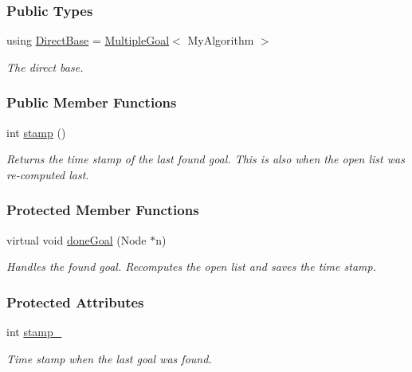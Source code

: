 \subsubsection*{Public Types}
\begin{DoxyCompactItemize}
\item 
using \hyperlink{structgoalHandler_1_1MaxHeuristic_a18437d08c3369dcc371a0cda5d3a3ad5}{Direct\+Base} = \hyperlink{structgoalHandler_1_1MultipleGoal}{Multiple\+Goal}$<$ My\+Algorithm $>$\hypertarget{structgoalHandler_1_1MaxHeuristic_a18437d08c3369dcc371a0cda5d3a3ad5}{}\label{structgoalHandler_1_1MaxHeuristic_a18437d08c3369dcc371a0cda5d3a3ad5}

\begin{DoxyCompactList}\small\item\em The direct base. \end{DoxyCompactList}\end{DoxyCompactItemize}
\subsubsection*{Public Member Functions}
\begin{DoxyCompactItemize}
\item 
int \hyperlink{structgoalHandler_1_1MaxHeuristic_a0c4d879c2cac99ca28665937b2e71324}{stamp} ()
\begin{DoxyCompactList}\small\item\em Returns the time stamp of the last found goal. This is also when the open list was re-\/computed last. \end{DoxyCompactList}\end{DoxyCompactItemize}
\subsubsection*{Protected Member Functions}
\begin{DoxyCompactItemize}
\item 
virtual void \hyperlink{structgoalHandler_1_1MaxHeuristic_a66dc44cb039e03abd0c641eb8a45c51a}{done\+Goal} (Node $\ast$n)
\begin{DoxyCompactList}\small\item\em Handles the found goal. Recomputes the open list and saves the time stamp. \end{DoxyCompactList}\end{DoxyCompactItemize}
\subsubsection*{Protected Attributes}
\begin{DoxyCompactItemize}
\item 
int \hyperlink{structgoalHandler_1_1MaxHeuristic_a7512a736c1337d52d0de80960629e16a}{stamp\+\_\+}\hypertarget{structgoalHandler_1_1MaxHeuristic_a7512a736c1337d52d0de80960629e16a}{}\label{structgoalHandler_1_1MaxHeuristic_a7512a736c1337d52d0de80960629e16a}

\begin{DoxyCompactList}\small\item\em Time stamp when the last goal was found. \end{DoxyCompactList}\end{DoxyCompactItemize}


